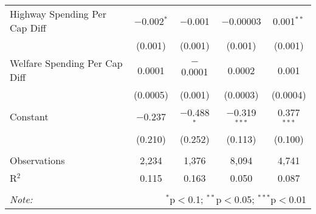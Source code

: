 \begin{table}[!htbp]
\begin{tabular}{@{\extracolsep{5pt}}lcccc}
  Highway Spending Per Cap Diff & $-$0.002$^{*}$ & $-$0.001 & $-$0.00003 & 0.001$^{**}$ \\ 
  & (0.001) & (0.001) & (0.001) & (0.001) \\ 
  Welfare Spending Per Cap Diff & 0.0001 & $-$0.0001 & 0.0002 & 0.001 \\ 
  & (0.0005) & (0.001) & (0.0003) & (0.0004) \\ 
  Constant & $-$0.237 & $-$0.488$^{*}$ & $-$0.319$^{***}$ & 0.377$^{***}$ \\ 
  & (0.210) & (0.252) & (0.113) & (0.100) \\ 
 \hline \\[-1.8ex] 
Observations & 2,234 & 1,376 & 8,094 & 4,741 \\ 
R$^{2}$ & 0.115 & 0.163 & 0.050 & 0.087 \\ 
\hline 
\hline \\[-1.8ex] 
\textit{Note:}  & \multicolumn{4}{r}{$^{*}$p$<$0.1; $^{**}$p$<$0.05; $^{***}$p$<$0.01} \\ 
\end{tabular} 
\end{table} 

